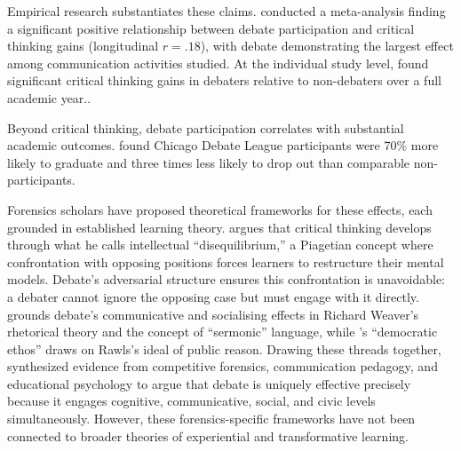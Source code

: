Empirical research substantiates these claims. \textcite{allen1999meta} conducted a meta-analysis finding a significant positive relationship between debate participation and critical thinking gains (longitudinal $r = .18$), with debate demonstrating the largest effect among communication activities studied. At the individual study level, \textcite{colbert1987effects} found significant critical thinking gains in debaters relative to non-debaters over a full academic year..

Beyond critical thinking, debate participation correlates with substantial academic outcomes. \textcite{mezuk2009urban} found Chicago Debate League participants were 70\% more likely to graduate and three times less likely to drop out than comparable non-participants.

Forensics scholars have proposed theoretical frameworks for these effects, each grounded in established learning theory. \textcite{colbert1995enhancing} argues that critical thinking develops through what he calls intellectual ``disequilibrium,'' a Piagetian concept where confrontation with opposing positions forces learners to restructure their mental models. Debate's adversarial structure ensures this confrontation is unavoidable: a debater cannot ignore the opposing case but must engage with it directly. \textcite{cirlin1997sociological} grounds debate's communicative and socialising effects in Richard Weaver's rhetorical theory and the concept of ``sermonic'' language, while \textcite{hicks1998public}'s ``democratic ethos'' draws on Rawls's ideal of public reason. Drawing these threads together, \textcite{bellon2000research} synthesized evidence from competitive forensics, communication pedagogy, and educational psychology to argue that debate is uniquely effective precisely because it engages cognitive, communicative, social, and civic levels simultaneously. However, these forensics-specific frameworks have not been connected to broader theories of experiential and transformative learning.


